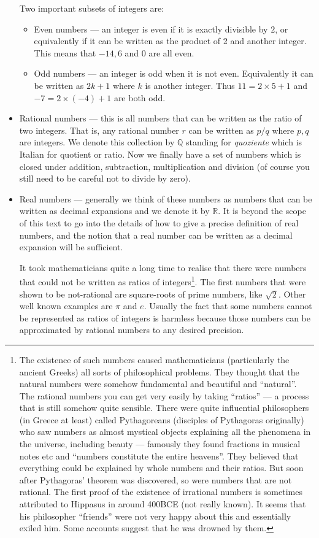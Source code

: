 \begin{itemize}
Two important subsets of integers are:
\begin{itemize}
 \item Even numbers --- an integer is even if it is exactly divisible by $2$, or
equivalently if it can be written as the product of 2 and another integer. This
means that $-14, 6$ and $0$ are all even.
\item Odd numbers --- an integer is odd when it is not even. Equivalently it
can be written as $2k+1$ where $k$ is another integer. Thus $11 = 2\times 5+1$
and $-7 = 2\times(-4)+1$ are both odd.
\end{itemize}

\item Rational numbers --- this is all numbers that can be written
as the ratio of two integers. That is, any rational number $r$ can be written
as $p/q$ where $p,q$ are integers. We denote this collection by $\mathbb{Q}$
standing for \emph{quoziente} which is Italian for quotient or ratio. Now we
finally have a set of numbers which is closed under addition, subtraction,
multiplication and division (of course you still need to be careful not to
divide by zero).

\item Real numbers --- generally we think of these numbers as numbers that can
be written as decimal expansions and we denote it by $\mathbb{R}$. It is beyond the
scope of this text to go into the details of how to give a precise definition of real
numbers, and the notion that a real number can be written as a decimal
expansion will be sufficient.

It took mathematicians quite a long time to realise that there were numbers
that could not be written as ratios of integers\footnote{The existence of such
numbers caused mathematicians (particularly the ancient Greeks) all sorts of
philosophical problems. They thought that the natural numbers were somehow
fundamental and beautiful and ``natural''. The rational numbers you can get very
easily by taking ``ratios'' --- a process that is still somehow quite sensible.
There were quite influential philosophers (in Greece at least) called
Pythagoreans (disciples of Pythagoras originally) who saw numbers as almost
mystical objects explaining all the phenomena in the universe, including beauty
--- famously they found fractions in musical notes etc and ``numbers constitute
the entire heavens''. They believed that everything could be explained by whole
numbers and their ratios. But soon after Pythagoras' theorem was discovered, so
were numbers that are not rational. The first proof of the existence of
irrational numbers is sometimes attributed to Hippasus in around 400BCE (not
really known). It seems that his philosopher ``friends'' were not very happy
about this and essentially exiled him. Some accounts suggest that he was drowned
by them. }. The first numbers that were shown to be not-rational are
square-roots of prime numbers, like $\sqrt{2}$. Other well known examples are
$\pi$ and $e$. Usually the fact that some numbers cannot be represented as
ratios of integers is harmless because those numbers can be approximated by
rational numbers to any desired precision.


\end{itemize}
